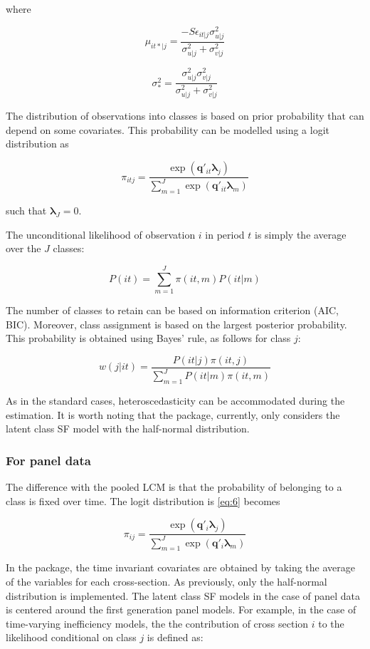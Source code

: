 \documentclass[nojss]{jss}
\begin{document}
where 

$$\mu_{it*|j}=\frac{- S\epsilon_{it|j}\sigma_{u|j}^2}{\sigma_{u|j}^2 +
\sigma_{v|j}^2}$$

 $$\sigma_*^2 = \frac{\sigma_{u|j}^2 \sigma_{v|j}^2}{\sigma_{u|j}^2 + 
 \sigma_{v|j}^2}$$

The distribution of observations into classes is based
on prior probability that can depend on some covariates. This probability can 
be modelled using a logit distribution as

\begin{equation} \label{eq:6}
\pi_{itj} = \frac{\exp{\left(\mathbf{q}'_{it}\bm{\lambda}_j\right)}}{
\sum_{m=1}^J \exp{\left(\mathbf{q}'_{it}\bm{\lambda}_m\right)}
}
\end{equation}

such that $\bm{\lambda}_J = 0$. 

The unconditional likelihood of observation $i$ in period $t$ is simply the average
 over the $J$ classes:

 $$P(it) = \sum_{m=1}^{J}\pi(it,m)P(it|m)$$

 The number of classes to retain can be based on information criterion (AIC, BIC).
 Moreover, class assignment is based on the largest posterior probability. This
 probability is obtained using Bayes' rule, as follows for class $j$:

 $$w\left(j|it\right)=\frac{P\left(it|j\right)
 \pi\left(it,j\right)}{\sum_{m=1}^JP\left(it|m\right)
 \pi\left(it, m\right)}$$
 
 As in the standard cases, heteroscedasticity can be accommodated during the 
 estimation. It is worth noting that the  package, currently, only considers
 the latent class SF model with the half-normal distribution.

\subsubsection{For panel data}

The difference with the pooled LCM is that the probability of belonging to 
a class is fixed over time. The logit distribution is \ref{eq:6} becomes

\begin{equation} \label{eq:7}
\pi_{ij} = \frac{\exp{\left(\mathbf{q}'_{i}\bm{\lambda}_j\right)}}{
\sum_{m=1}^J \exp{\left(\mathbf{q}'_{i}\bm{\lambda}_m\right)}
}
\end{equation}

In the  package, the time invariant covariates are obtained by taking
the average of the variables for each cross-section. As previously, only the 
half-normal distribution is implemented. The latent class SF models in the 
case of panel data is centered around the first generation panel models. For
example, in the case of time-varying inefficiency models, the the contribution 
of cross section $i$ to the likelihood conditional on class $j$ is defined as: 
\end{document}
